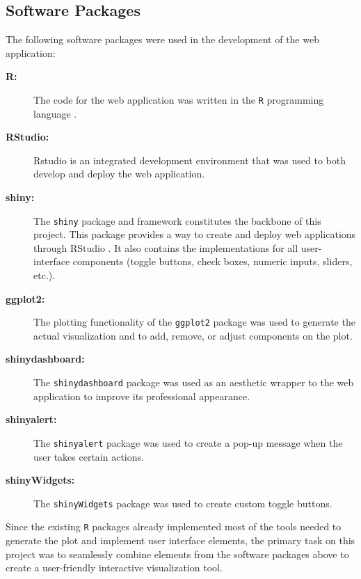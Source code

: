 \documentclass[11pt]{asaproc}\usepackage[]{graphicx}\usepackage[]{color}
\begin{document}
\subsection{Software Packages}
The following software packages were used in the development of the web application:

\begin{description}

\item[{\bf R:}] The code for the web application was written in the {\tt R} programming language \citep{R}.

\item[{\bf RStudio:}] Rstudio \citep{RSTUDIO} is an integrated development environment that was used to both develop and deploy the web application.

\item[{\bf shiny:}] The {\tt shiny} package and framework \citep{SHINY} constitutes the backbone of this project. This package provides a way to create and deploy web applications through RStudio \citep{RSTUDIO}. It also contains the implementations for all user-interface components (toggle buttons, check boxes, numeric inputs, sliders, etc.). 

\item[{\bf ggplot2:}] The plotting functionality of the {\tt ggplot2} package \citep{GGPLOT} was used to generate the actual visualization and to add, remove, or adjust components on the plot. 

\item[{\bf shinydashboard:}] The {\tt shinydashboard} package \citep{DASH} was used as an aesthetic wrapper to the web application to improve its professional appearance. 

\item[{\bf shinyalert:}] The {\tt shinyalert} package \citep{SALERT} was used to create a pop-up message when the user takes certain actions.

\item[{\bf shinyWidgets:}] The {\tt shinyWidgets} package \citep{SWIDGET} was used to create custom toggle buttons.

\end{description}

\vspace{5mm}

Since the existing {\tt R} packages already implemented most of the tools needed to generate the plot and implement user interface elements, the primary task on this project was to seamlessly combine elements from the software packages above to create a user-friendly interactive visualization tool. 
\end{document}
